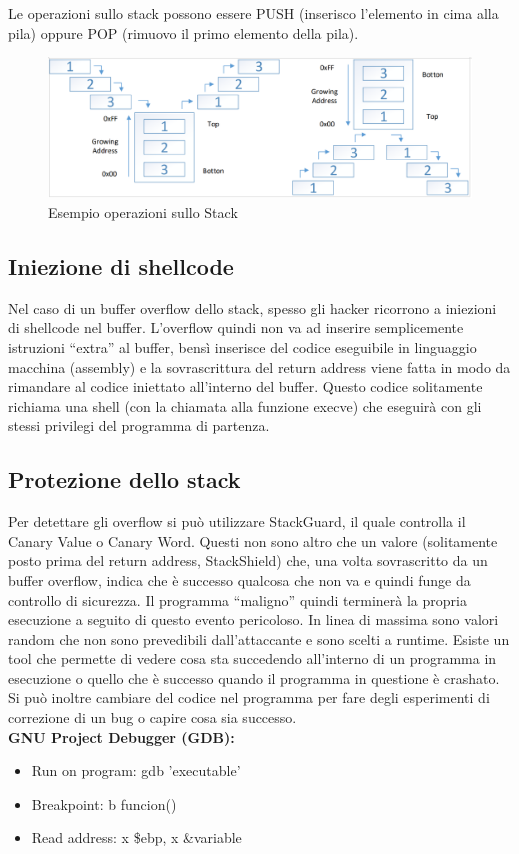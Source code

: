 \documentclass[8pt]{extarticle}
\begin{document}
Le operazioni sullo stack possono essere PUSH (inserisco l’elemento in cima alla pila) 
oppure POP (rimuovo il primo elemento della pila). 
\begin{figure}[H]
    \center
    \includegraphics[scale=0.25]{images/BO5.png}
    \caption{Esempio operazioni sullo Stack}\label{fig:1}
\end{figure}
\subsection{Iniezione di shellcode}
Nel caso di un buffer overflow dello stack, spesso gli hacker ricorrono a iniezioni di shellcode nel buffer. 
L’overflow quindi non va ad inserire semplicemente istruzioni “extra” al buffer, bensì inserisce del codice 
eseguibile in linguaggio macchina (assembly) e la sovrascrittura del return address viene fatta in modo da 
rimandare al codice iniettato all’interno del buffer. Questo codice solitamente richiama una shell (con la 
chiamata alla funzione execve) che eseguirà con gli stessi privilegi del programma di partenza. 
\subsection{Protezione dello stack}
Per detettare gli overflow si può utilizzare StackGuard, il quale controlla il Canary Value o Canary Word. 
Questi non sono altro che un valore (solitamente posto prima del return address, StackShield) che, una volta 
sovrascritto da un buffer overflow, indica che è successo qualcosa che non va e quindi funge da controllo di 
sicurezza. Il programma “maligno” quindi terminerà la propria esecuzione a seguito di questo evento pericoloso. 
In linea di massima sono valori random che non sono prevedibili dall’attaccante e sono scelti a runtime. 
Esiste un tool che permette di vedere cosa sta succedendo all’interno di un programma in esecuzione o quello 
che è successo quando il programma in questione è crashato. Si può inoltre cambiare del codice nel programma 
per fare degli esperimenti di correzione di un bug o capire cosa sia successo. \\
\textbf{GNU Project Debugger (GDB):}
\begin{itemize}
    \item Run on program: gdb 'executable'
    \item Breakpoint: b funcion()
    \item Read address: x \$ebp, x \&variable
\end{itemize}
\end{document}
